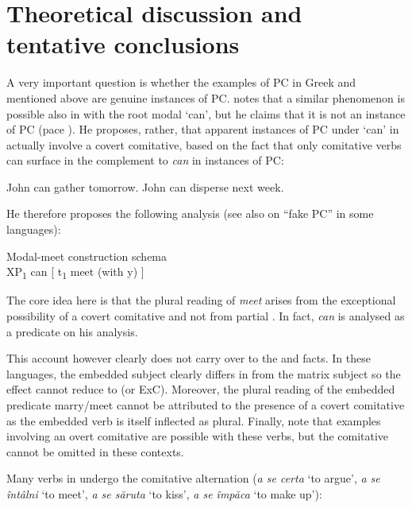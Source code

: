 \documentclass[output=paper]{langsci/langscibook}
\begin{document}
\section{Theoretical discussion and tentative conclusions}\label{sec:key:24.5}

A very important question is whether the examples of
\gls{PC} in Greek and  mentioned above are
genuine instances of PC. \citet{Poole2015} notes that a similar phenomenon is
possible also in  with the root modal ‘can’, but he claims that it is
not an instance of \gls{PC} (pace
\citealt{Rodrigues2007}). He proposes, rather, that apparent instances of
\gls{PC} under ‘can’ in  actually involve a
covert comitative, based on the fact that only comitative verbs can surface in
the complement to \emph{can} in instances of \gls{PC}:

\ea%
    \label{ex:key:24.40} \textcite[14]{Poole2015}
	\ea *John can gather tomorrow.
	\ex *John can disperse next week.
	\z
\z

He therefore proposes the following analysis (see also \citealt{Sheehan2014c} on
\enquote{fake \gls{PC}} in some  languages):

\ea\label{ex:key:24.41} Modal-meet construction schema \parencite[15]{Poole2015}\\%
    XP\textsubscript{1} can [ t\textsubscript{1} meet (with y) ]
\z

The core idea here is that the plural reading of \emph{meet} arises from the
exceptional possibility of a covert comitative and not from partial . In
fact, \emph{can} is analysed as a  predicate on his
analysis.

This account however clearly does not carry over to the  and
 facts. In these languages, the embedded subject clearly differs in 
from the matrix subject so the effect cannot reduce to  (or \gls{ExC}).
Moreover, the plural reading of the embedded predicate marry/meet cannot be
attributed to the presence of a covert comitative as the embedded verb is
itself inflected as plural. Finally, note that examples involving an overt
comitative are possible with these verbs, but the comitative cannot be omitted
in these contexts.

Many verbs in  undergo the comitative alternation (\emph{a se certa}
‘to argue’, \emph{a se întâlni} ‘to meet’, \emph{a se săruta} ‘to kiss’,
\emph{a se împăca} ‘to make up’):
\end{document}
